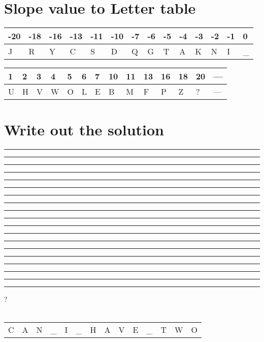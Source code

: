 \documentclass[12pt]{article}
\begin{document}
\section*{Slope value to Letter table}
\noindent %
\begin{tabularx}{\textwidth}{|*{14}{W|}} %
\hline
\textbf{-20} & \textbf{-18} & \textbf{-16} & \textbf{-13} & \textbf{-11} & \textbf{-10} & \textbf{-7} & \textbf{-6} & \textbf{-5} & \textbf{-4} & \textbf{-3} & \textbf{-2} & \textbf{-1} & \textbf{0} \\
\hline
J & R & Y & C & S & D & Q & G & T & A & K & N & I & \_ \\
\hline
\end{tabularx}

\vspace{1em} %

\noindent
\begin{tabularx}{\textwidth}{|*{14}{W|}} %
\hline
\textbf{1} & \textbf{2} & \textbf{3} & \textbf{4} & \textbf{5} & \textbf{6} & \textbf{7} & \textbf{10} & \textbf{11} & \textbf{13} & \textbf{16} & \textbf{18} & \textbf{20} & \textbf{---} \\
\hline
U & H & V & W & O & L & E & B & M & F & P & Z & ? & --- \\
\hline
\end{tabularx}

\section*{Write out the solution}



\noindent \rule{0.3cm}{0.4pt} \rule{0.3cm}{0.4pt} \rule{0.3cm}{0.4pt} \quad \rule{0.3cm}{0.4pt} \quad \rule{0.3cm}{0.4pt} \rule{0.3cm}{0.4pt} \rule{0.3cm}{0.4pt} \rule{0.3cm}{0.4pt} \quad \rule{0.3cm}{0.4pt} \rule{0.3cm}{0.4pt} \rule{0.3cm}{0.4pt} \rule{0.3cm}{0.4pt} \rule{0.3cm}{0.4pt} \quad \rule{0.3cm}{0.4pt} \rule{0.3cm}{0.4pt} \rule{0.3cm}{0.4pt} \rule{0.3cm}{0.4pt} \rule{0.3cm}{0.4pt} \rule{0.3cm}{0.4pt} \quad ?
\\\\
\noindent %
\begin{tabularx}{\textwidth}{|*{14}{W|}} %
\hline
& & & & & & & & & & & & \\
\hline
C & A & N & \_ & I & \_ & H & A & V & E & \_ & T & W & O \\
\hline
\end{tabularx}
\end{document}
